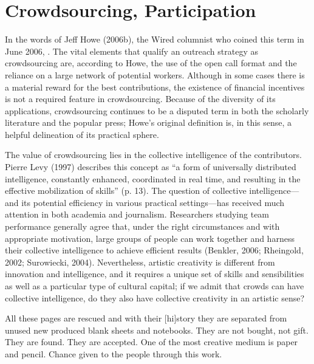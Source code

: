 \section{Crowdsourcing, Participation}
In the words of Jeff Howe (2006b), the Wired columnist who coined this term in June 2006, . The vital elements that qualify an outreach strategy as crowdsourcing are, according to Howe, the use of the open call format and the reliance on a large network of potential workers. Although in some cases there is a material reward for the best contributions, the existence of financial incentives is not a required feature in crowdsourcing. Because of the diversity of its applications, crowdsourcing continues to be a disputed term in both the scholarly literature and the popular press; Howe’s original definition is, in this sense, a helpful delineation of its practical sphere.

The value of crowdsourcing lies in the collective intelligence of the contributors. Pierre Levy (1997) describes this concept as “a form of universally distributed intelligence, constantly enhanced, coordinated in real time, and resulting in the effective mobilization of skills” (p. 13). The question of collective intelligence—and its potential efficiency in various practical settings—has received much attention in both academia and journalism. Researchers studying team performance generally agree that, under the right circumstances and with appropriate motivation, large groups of people can work together and harness their collective intelligence to achieve efficient results (Benkler, 2006; Rheingold, 2002; Surowiecki, 2004). Nevertheless, artistic creativity is different from innovation and intelligence, and it requires a unique set of skills and sensibilities as well as a particular type of cultural capital; if we admit that crowds can have collective intelligence, do they also have collective creativity in an artistic sense?

All these pages are rescued and with their [hi]story they are separated from unused new produced blank sheets and notebooks. They are not bought, not gift. They are found. They are accepted. One of the most creative medium is paper and pencil. Chance given to the people through this work.

